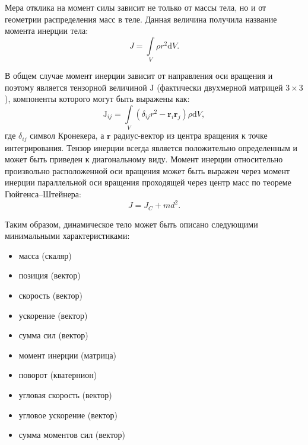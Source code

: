 Мера отклика на момент силы зависит не только от массы тела, но и от геометрии распределения
масс в теле. Данная величина получила название момента инерции тела:
\begin{equation}
 J=\int\limits_{V} \rho r^2\mathrm{d}V.
\end{equation}

В общем случае момент инерции зависит от направления оси вращения и поэтому является тензорной
величиной $\mathrm{J}$ (фактически двухмерной матрицей \begin{math}3\times3\end{math}), компоненты которого могут
быть выражены как:
\begin{equation}
 \mathrm{J}_{ij} = \int\limits_{V} (\delta_{ij}r^2 - \mathbf{r}_i \mathbf{r}_j) \rho \mathrm{d}V,
\end{equation}
где $\delta_{ij}$ символ Кронекера, а $\mathbf{r}$ радиус-вектор из центра вращения к точке интегрирования.
Тензор инерции всегда является положительно определенным и может быть приведен к диагональному виду. Момент
инерции относительно произвольно расположенной оси вращения может быть выражен через момент инерции параллельной
оси вращения проходящей через центр масс по теореме Гюйгенса--Штейнера:
\begin{equation}
 J=J_C+md^2.
\end{equation}


Таким образом, динамическое тело может быть описано
следующими минимальными характеристиками:
\begin{itemize}
  \item масса (скаляр)
  \item позиция (вектор)
  \item скорость (вектор)
  \item ускорение (вектор) %
  \item сумма сил (вектор) %
  \item момент инерции (матрица)
  \item поворот (кватернион)
  \item угловая скорость (вектор)
  \item угловое ускорение (вектор) %
  \item сумма моментов сил (вектор) %
\end{itemize}

